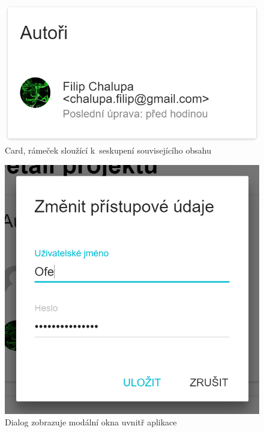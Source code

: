\begin{figure}[ht]
	\centering
	\includegraphics[scale=0.5]{sections/ui/images/Card.png}
	\caption[Card]{Card, rámeček sloužící k~seskupení souvisejícího obsahu}
	\label{fig:card}
\end{figure}

\begin{figure}[ht]
	\centering
	\includegraphics[scale=0.5]{sections/ui/images/Dialog.png}
	\caption[Dialog]{Dialog zobrazuje modální okna uvnitř aplikace}
	\label{fig:dialog}
\end{figure}

